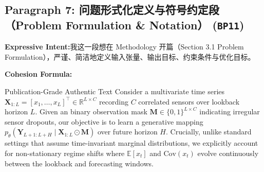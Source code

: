 \subsection*{Paragraph 7: 问题形式化定义与符号约定段（Problem Formulation \& Notation） (\texttt{BP11})}
\noindent\textbf{Expressive Intent:}\enspace 我这一段想在 Methodology 开篇（Section 3.1 Problem Formulation），严谨、简洁地定义输入张量、输出目标、约束条件与优化目标。\par
\noindent\textbf{Cohesion Formula:}\par\vspace{4pt}
\begin{ExampleBox}{Publication-Grade Authentic Text}
Consider a multivariate time series $\mathbf{X}_{1:L} = [x_1, \dots, x_L]^\top \in \mathbb{R}^{L \times C}$ recording $C$ correlated sensors over lookback horizon $L$. Given an binary observation mask $\mathbf{M} \in \{0, 1\}^{L \times C}$ indicating irregular sensor dropouts, our objective is to learn a generative mapping $p_\theta(\mathbf{Y}_{L+1:L+H} \mid \mathbf{X}_{1:L} \odot \mathbf{M})$ over future horizon $H$. Crucially, unlike standard settings that assume time-invariant marginal distributions, we explicitly account for non-stationary regime shifts where $\mathbb{E}[x_t]$ and $\text{Cov}(x_t)$ evolve continuously between the lookback and forecasting windows.
\end{ExampleBox}
